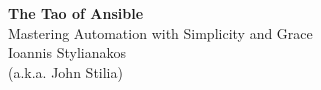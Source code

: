 \cleardoublepage  %
\thispagestyle{empty}  %

\begin{center}
\vspace*{2in}  %

{\Huge\bfseries The Tao of Ansible}\\[0.5cm]

{\large Mastering Automation with Simplicity and Grace}\\[6cm]  %

{\large Ioannis Stylianakos}\\[0.5cm]
{\small (a.k.a. John Stilia)}

\vfill  %
\end{center}

\clearpage 